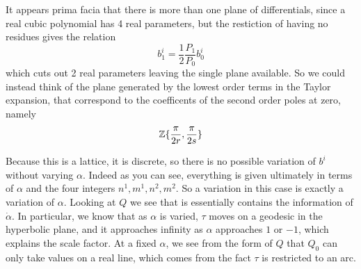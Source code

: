 It appears prima facia that there is more than one plane of differentials, since a real cubic polynomial has 4 real parameters, but the restiction of having no residues gives the relation
\[
b^i_1 = \frac{1}{2}\frac{P_1}{P_0}b^i_0
\]
which cuts out 2 real parameters leaving the single plane available. So we could instead think of the plane generated by the lowest order terms in the Taylor expansion, that correspond to the coefficents of the second order poles at zero, namely
\[
\mathbb{Z}\{\frac{\pi}{2r}, \frac{\pi}{2s}\}
\]

Because this is a lattice, it is discrete, so there is no possible variation of $b^i$ without varying $\alpha$. Indeed as you can see, everything is given ultimately in terms of $\alpha$ and the four integers $n^1,m^1,n^2,m^2$. So a variation in this case is exactly a variation of $\alpha$. Looking at $Q$ we see that is essentially contains the information of $\dot\alpha$. In particular, we know that as $\alpha$ is varied, $\tau$ moves on a geodesic in the hyperbolic plane, and it approaches infinity as $\alpha$ approaches $1$ or $-1$, which explains the scale factor. At a fixed $\alpha$, we see from the form of $Q$ that $Q_0$ can only take values on a real line, which comes from the fact $\tau$ is restricted to an arc.

